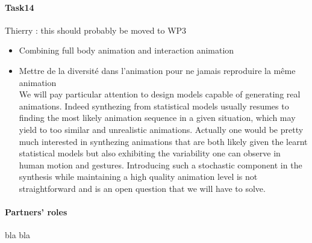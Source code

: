 \paragraph{Task14} Thierry : this should probably be moved to WP3\\
\begin{itemize}
  \item Combining full 	body animation and interaction animation
  \item Mettre de la diversité dans l'animation pour ne jamais reproduire la même animation\\
  
We will pay particular attention to design models capable of generating real animations. Indeed synthezing from statistical models usually resumes to finding the most likely animation sequence in a given situation, which may yield to too similar and unrealistic animations. 
Actually one would be pretty much interested in synthezing animations that are both likely given the learnt statistical models but also exhibiting the variability one can observe in human motion and gestures. Introducing such a stochastic component in the synthesis while maintaining a high quality animation level is not 
straightforward and is an open question that we will have to solve.
\end{itemize}

\paragraph{Partners' roles}

bla bla

\endinput